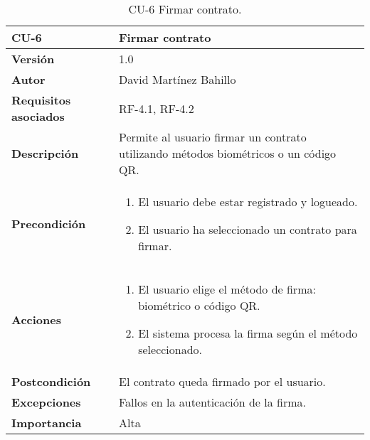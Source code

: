\begin{table}[p]
	\centering
	\begin{tabularx}{\linewidth}{ p{} p{} }
		\toprule
		\textbf{CU-6}    & \textbf{Firmar contrato}\\
		\midrule
		\textbf{Versión}              & 1.0    \\
		\textbf{Autor}                & David Martínez Bahillo \\
		\textbf{Requisitos asociados} & RF-4.1, RF-4.2 \\
		\textbf{Descripción}          & Permite al usuario firmar un contrato utilizando métodos biométricos o un código QR. \\
		\textbf{Precondición}         &  
		\begin{enumerate}
			\def\labelenumi{\arabic{enumi}.}
			\tightlist
			\item El usuario debe estar registrado y logueado.
			\item El usuario ha seleccionado un contrato para firmar.
		\end{enumerate}\\
		\textbf{Acciones}             &
		\begin{enumerate}
			\def\labelenumi{\arabic{enumi}.}
			\tightlist
			\item El usuario elige el método de firma: biométrico o código QR.
			\item El sistema procesa la firma según el método seleccionado.
		\end{enumerate}\\
		\textbf{Postcondición}        & El contrato queda firmado por el usuario. \\
		\textbf{Excepciones}          & Fallos en la autenticación de la firma. \\
		\textbf{Importancia}          & Alta  \\
		\bottomrule
	\end{tabularx}
	\caption{CU-6 Firmar contrato.}
\end{table}


